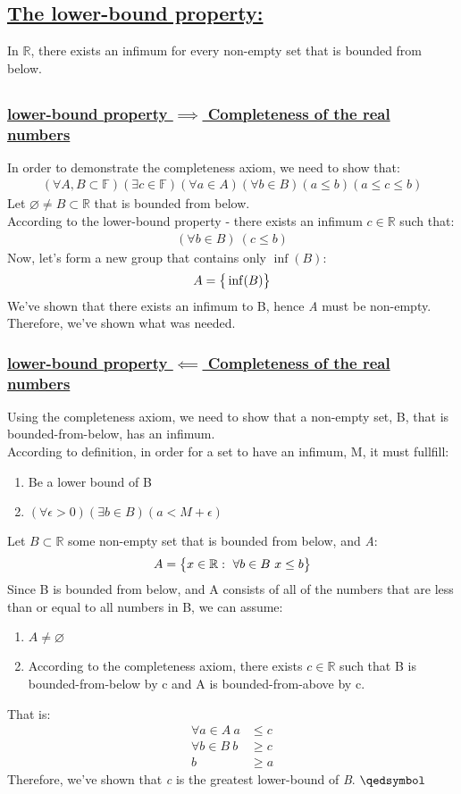 \documentclass[a4paper, 12pt]{article}
\newcommand{\sub}[1]{\subsection{\underline{#1}}}
\newcommand{\subsub}[1]{\subsubsection{\underline{#1}}}
\newcommand{\R}{\ensuremath{\mathbb{R}}}
\newcommand{\F}{\ensuremath{\mathbb{F}}}
\newcommand{\eq}[1]{\begin{align*}#1\end{align*}}
\renewcommand{\qed}{\hfill\(\qedsymbol\)}
\begin{document}
\section{}
\sub{The lower-bound property:}
{\Large{In \R, there exists an infimum for every non-empty set that is bounded from below.}}
\sub{}
\subsub{lower-bound property $\implies$ Completeness of the real numbers}
In order to demonstrate the completeness axiom, we need to show that:
\eq{(\forall{A,B}\subset\F)(\exists{c}\in\F)(\forall{a}\in{A})(\forall{b}\in{B})(a\leq{b})(a\leq{c}\leq{b})}
Let $\varnothing\neq{B}\subset\R$ that is bounded from below.\\
According to the lower-bound property - there exists an infimum $c\in\R$ such that:
\eq{(\forall{b}\in{B})~(c\leq{b})}
Now, let's form a new group that contains only $\inf(B)$: \eq{A=\big\{\inf(B)\big{\}}}
We've shown that there exists an infimum to B, hence \textit{A} must be non-empty.\\
Therefore, we've shown what was needed.
\subsub{lower-bound property $\impliedby$ Completeness of the real numbers}
Using the completeness axiom, we need to show that a non-empty set, B, that is bounded-from-below, has an infimum.\\
According to definition, in order for a set to have an infimum, M, it must fullfill:
\begin{enumerate}
    \item Be a lower bound of B
    \item $(\forall\epsilon>0)(\exists{b}\in{B})(a<M+\epsilon)$
\end{enumerate}
Let $B\subset\R$ some non-empty set that is bounded from below, and \textit{A}: \eq{A=\big\{x\in\R:~\forall{b}\in{B}~x\leq{b}\big{\}}}
Since B is bounded from below, and A consists of all of the numbers that are less than or equal to all numbers in B, we can assume:
\begin{enumerate}
    \item $A\neq{\varnothing}$
    \item According to the completeness axiom, there exists $c\in\R$ such that B is bounded-from-below by c and A is bounded-from-above by c.
\end{enumerate}
That is: \eq{\forall{a}\in{A}~a&\leq{c}\\\forall{b}\in{B}~b&\geq{c}\\b&\geq{a}}
Therefore, we've shown that \textit{c} is the greatest lower-bound of \textit{B}.
\qed

\end{document}
